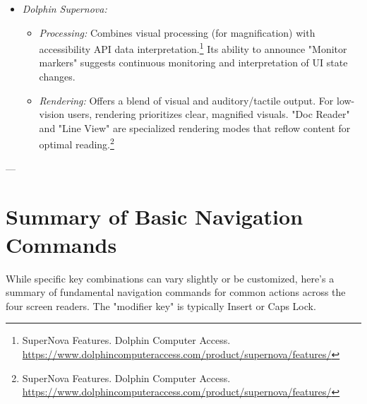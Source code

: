 \begin{itemize}
\begin{itemize}
        \item \emph{Rendering:} Aims for a streamlined and integrated experience within Windows. Adapts reading behavior (tab-sequence vs. document reading) based on UI element purpose.\footnote{Narrator Technical Details. Microsoft Learn. \url{https://learn.microsoft.com/en-us/windows/win32/wnauto/narrator-technical-details}}
    \end{itemize}
    \item \emph{Dolphin Supernova:}
    \begin{itemize}
        \item \emph{Processing:} Combines visual processing (for magnification) with accessibility API data interpretation.\footnote{SuperNova Features. Dolphin Computer Access. \url{https://www.dolphincomputeraccess.com/product/supernova/features/}} Its ability to announce "Monitor markers" suggests continuous monitoring and interpretation of UI state changes.
        \item \emph{Rendering:} Offers a blend of visual and auditory/tactile output. For low-vision users, rendering prioritizes clear, magnified visuals. "Doc Reader" and "Line View" are specialized rendering modes that reflow content for optimal reading.\footnote{SuperNova Features. Dolphin Computer Access. \url{https://www.dolphincomputeraccess.com/product/supernova/features/}}
    \end{itemize}
\end{itemize}

---

\section{Summary of Basic Navigation Commands}
\label{sec:summary-navigation}

While specific key combinations can vary slightly or be customized, here's a summary of fundamental navigation commands for common actions across the four screen readers. The "modifier key" is typically Insert or Caps Lock.

